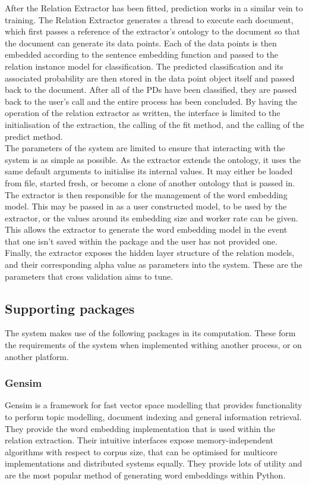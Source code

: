 \documentclass[12pt]{article} %
\begin{document}
After the Relation Extractor has been fitted, prediction works in a similar vein to training. The Relation Extractor generates a thread to execute each document, which first passes a reference of the extractor's ontology to the document so that the document can generate its data points. Each of the data points is then embedded according to the sentence embedding function and passed to the relation instance model for classification. The predicted classification and its associated probability are then stored in the data point object itself and passed back to the document. After all of the PDs have been classified, they are passed back to the user's call and the entire process has been concluded. By having the operation of the relation extractor as written, the interface is limited to the initialisation of the extraction, the calling of the fit method, and the calling of the predict method.\\

The parameters of the system are limited to ensure that interacting with the system is as simple as possible. As the extractor extends the ontology, it uses the same default arguments to initialise its internal values. It may either be loaded from file, started fresh, or become a clone of another ontology that is passed in. The extractor is then responsible for the management of the word embedding model. This may be passed in as a user constructed model, to be used by the extractor, or the values around its embedding size and worker rate can be given. This allows the extractor to generate the word embedding model in the event that one isn't saved within the package and the user has not provided one. Finally, the extractor exposes the hidden layer structure of the relation models, and their corresponding alpha value as parameters into the system. These are the parameters that cross validation aims to tune.

\subsection{Supporting packages}

The system makes use of the following packages in its computation. These form the requirements of the system when implemented withing another process, or on another platform.

\subsubsection{Gensim}
Gensim is a framework for fast vector space modelling that provides functionality to perform topic modelling, document indexing and general information retrieval. They provide the word embedding implementation that is used within the relation extraction. Their intuitive interfaces expose memory-independent algorithms with respect to corpus size, that can be optimised for multicore implementations and distributed systems equally. They provide lots of utility and are the most popular method of generating word embeddings within Python.
\end{document}

